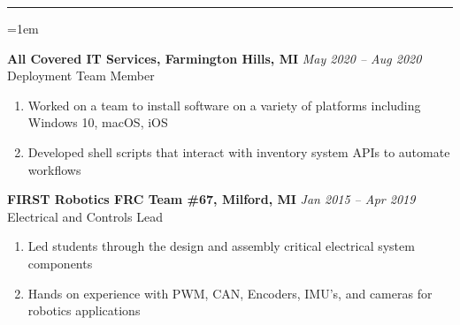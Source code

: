 \documentclass[12pt]{article}
\newcommand{\rheader}[1] { 
    \noindent{ 
        \large 
        \textbf{#1} 
        \par 
    }
    \vspace{-10pt}
    \noindent 
    \rule{7.5in}{0.5pt} 
}
\newcommand{\rdate}[1] {
    \hfill 
    \textit{#1}
}
\newcommand{\ritem} {
    \vspace{-10pt} 
    \item
}
\newenvironment{rsection} {
    \vspace{-5pt}
    \par 
    \medskip
    \leftskip=1em
    \noindent 
    \ignorespaces
} {
    \par 
    \medskip
    \vspace{5pt}
}
\newenvironment{rlist} {
    \begin{enumerate}[leftmargin=0.5in, label=$\bullet$]
} {
    \end{enumerate}
    \vspace{-10pt}
}
\begin{document}
\rheader{EXPERIENCE}
\begin{rsection}
    \textbf{All Covered IT Services, Farmington Hills, MI} \rdate{May 2020 -- Aug 2020} \\
    Deployment Team Member
    \begin{rlist}
        \ritem Worked on a team to install software on a variety of platforms including Windows 10, macOS, iOS
        \ritem Developed shell scripts that interact with inventory system APIs to automate workflows
    \end{rlist}
    \vspace{5pt}
    \textbf{FIRST Robotics FRC Team \#67, Milford, MI} \rdate{Jan 2015 -- Apr 2019} \\
    Electrical and Controls Lead
    \begin{rlist}
        \ritem Led students through the design and assembly critical electrical system components
        \ritem Hands on experience with PWM, CAN, Encoders, IMU's, and cameras for robotics applications
    \end{rlist}
\end{rsection}
\end{document}
